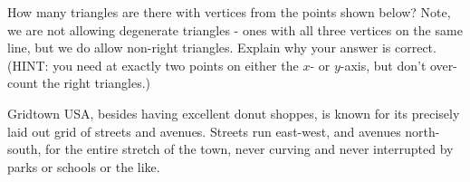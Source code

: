 \begin{questions}
\question How many triangles are there with vertices from the points shown below?  Note, we are not allowing degenerate triangles - ones with all three vertices on the same line, but we do allow non-right triangles.  Explain why your answer is correct. (HINT: you need at exactly two points on either the $x$- or $y$-axis, but don't over-count the right triangles.)

\begin{center}
\end{center}

%  
%



\question Gridtown USA, besides having excellent donut shoppes, is known for its precisely laid out grid of streets and avenues.  Streets run east-west, and avenues north-south, for the entire stretch of the town, never curving and never interrupted by parks or schools or the like.


\end{questions}
